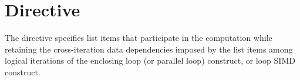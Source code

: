 %
%
%
%
%
%
%
%
%
%
%
%
%

\section{ Directive}
\label{sec:scan Directive}

\summary
The  directive specifies list items that participate in the  
computation while retaining the cross-iteration data dependencies imposed by the  list items among 
logical iterations of the enclosing loop (or parallel loop) construct,  or loop SIMD construct. 


